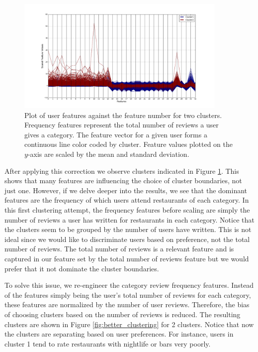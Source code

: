 \documentclass[11pt]{article}
\begin{document}
 \begin{figure}[h!]
 	\centering
 	\includegraphics[width=0.9\textwidth]{old_features.png}
 	\caption{Plot of user features against the feature number for two clusters. Frequency features represent the total number of reviews a user gives a category. The feature vector for a given user forms a continuous line color coded by cluster. Feature values plotted on the $y$-axis are scaled by the mean and standard deviation.}
 	\label{fig:bad_clustering}
 \end{figure} 
 
 After applying this correction we observe clusters indicated in Figure \ref{fig:bad_clustering}. This shows that many features are influencing the choice of cluster boundaries, not just one. However, if we delve deeper into the results, we see that the dominant features are the frequency of which users attend restaurants of each category. In this first clustering attempt, the frequency features before scaling are simply the number of reviews a user has written for restaurants in each category. Notice that the clusters seem to be grouped by the number of users have written. This is not ideal since we would like to discriminate users based on preference, not the total number of reviews. The total number of reviews is a relevant feature and is captured in our feature set by the total number of reviews feature but we would prefer that it not dominate the cluster boundaries.
 
 To solve this issue, we re-engineer the category review frequency features. Instead of the features simply being the user's total number of reviews for each category, these features are normalized by the number of user reviews. Therefore, the bias of choosing clusters based on the number of reviews is reduced. The resulting clusters are shown in Figure \ref{fig:better_clustering} for 2 clusters. Notice that now the clusters are separating based on user preferences. For instance, users in cluster 1 tend to rate restaurants with nightlife or bars very poorly.
\end{document}
